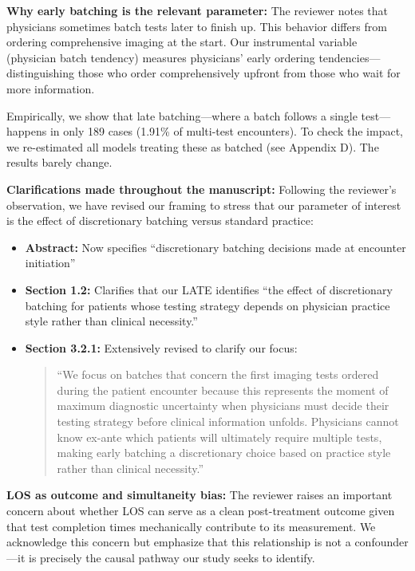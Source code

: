 \documentclass[11pt]{article}
\newcommand{\1}{\hbox{\rm 1\kern-.35em 1}}
\begin{document}
\textbf{Why early batching is the relevant parameter:} The reviewer notes that physicians sometimes batch tests later to finish up. This behavior differs from ordering comprehensive imaging at the start. Our instrumental variable (physician batch tendency) measures physicians’ early ordering tendencies—distinguishing those who order comprehensively upfront from those who wait for more information.

Empirically, we show that late batching—where a batch follows a single test—happens in only 189 cases (1.91\% of multi-test encounters). To check the impact, we re-estimated all models treating these as batched (see Appendix D). The results barely change.

\textbf{Clarifications made throughout the manuscript:} Following the reviewer's observation, we have revised our framing to stress that our parameter of interest is the effect of discretionary batching versus standard practice:

\begin{itemize}
\item \textbf{Abstract:} Now specifies ``discretionary batching decisions made at encounter initiation''

\item \textbf{Section 1.2:} Clarifies that our LATE identifies ``the effect of discretionary batching for patients whose testing strategy depends on physician practice style rather than clinical necessity.''

\item \textbf{Section 3.2.1:} Extensively revised to clarify our focus:

\begin{quote}
``We focus on batches that concern the first imaging tests ordered during the patient encounter because this represents the moment of maximum diagnostic uncertainty when physicians must decide their testing strategy before clinical information unfolds. Physicians cannot know ex-ante which patients will ultimately require multiple tests, making early batching a discretionary choice based on practice style rather than clinical necessity.''
\end{quote}
\end{itemize}

\textbf{LOS as outcome and simultaneity bias:} The reviewer raises an important concern about whether LOS can serve as a clean post-treatment outcome given that test completion times mechanically contribute to its measurement. We acknowledge this concern but emphasize that this relationship is not a confounder---it is precisely the causal pathway our study seeks to identify.
\end{document}
